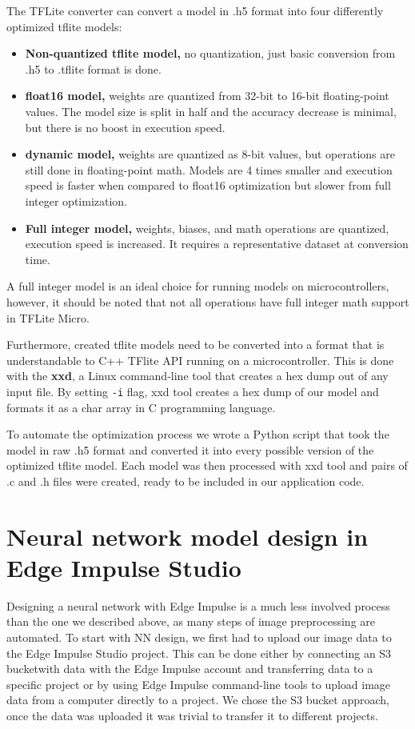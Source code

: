 The TFLite converter can convert a model in .h5 format into four differently optimized tflite models:
\begin{itemize}
    \item \textbf{Non-quantized tflite model,} no quantization, just basic conversion from .h5 to .tflite format is done.
    \item \textbf{float16 model,} weights are quantized from 32-bit to 16-bit floating-point values. The model size is split in half and the accuracy decrease is minimal, but there is no boost in execution speed.
    \item \textbf{dynamic model,} weights are quantized as 8-bit values, but operations are still done in floating-point math. Models are 4 times smaller and execution speed is faster when compared to float16 optimization but slower from full integer optimization.
    \item \textbf{Full integer model,} weights, biases, and math operations are quantized, execution speed is increased. It requires a representative dataset at conversion time.
\end{itemize}

A full integer model is an ideal choice for running models on microcontrollers, however, it should be noted that not all operations have full integer math support in TFLite Micro.

Furthermore, created tflite models need to be converted into a format that is understandable to C++ TFlite API running on a microcontroller.
This is done with the \textbf{xxd}, a Linux command-line tool that creates a hex dump out of any input file.
By setting \verb|-i| flag,  xxd tool creates a hex dump of our model and formats it as a char array in C programming language. 

To automate the optimization process we wrote a Python script that took the model in raw .h5 format and converted it into every possible version of the optimized tflite model.
Each model was then processed with xxd tool and pairs of .c and .h files were created, ready to be included in our application code.


\section{ Neural network model design in Edge Impulse Studio}

Designing a neural network with Edge Impulse is a much less involved process than the one we described above, as many steps of image preprocessing are automated.
To start with NN design, we first had to upload our image data to the Edge Impulse Studio project.
This can be done either by connecting an S3 bucket\footnotemark with data with the Edge Impulse account and transferring data to a specific project or by using Edge Impulse command-line tools to upload image data from a computer directly to a project.
We chose the S3 bucket approach, once the data was uploaded it was trivial to transfer it to different projects.

